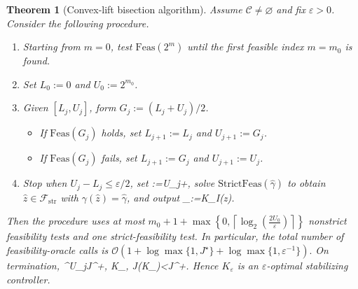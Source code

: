 \documentclass[letterpaper,10pt,conference]{ieeeconf}
\def\[#1\]{\begin{align*}#1\end{align*}}
\providecommand{\cC}{\mathcal{C}}
\providecommand{\cF}{\mathcal{F}}
\renewcommand{\^}[1]{^{(#1)}}
\newtheorem{theorem}{Theorem}
\begin{document}
\begin{theorem}[Convex-lift bisection algorithm]\label{thm:bisection}
Assume $\cC\neq\varnothing$ and fix $\varepsilon>0$. Consider the following procedure.
\begin{enumerate}
    \item Starting from $m=0$, test $\mathrm{Feas}(2^m)$ until the first feasible index $m=m_0$ is found.
    \item Set $L_0:=0$ and $U_0:=2^{m_0}$.
    \item Given $[L_j,U_j]$, form $G_j:=(L_j+U_j)/2$.
    \begin{itemize}[leftmargin=1em]
        \item If $\mathrm{Feas}(G_j)$ holds, set $L_{j+1}:=L_j$ and $U_{j+1}:=G_j$.
        \item If $\mathrm{Feas}(G_j)$ fails, set $L_{j+1}:=G_j$ and $U_{j+1}:=U_j$.
    \end{itemize}
    \item Stop when $U_j-L_j\le\varepsilon/2$, set
    \[
    \widehat\gamma:=U_j+,
    \]
    solve $\mathrm{StrictFeas}(\widehat\gamma)$ to obtain $\widehat z\in\cF_{\mathrm{str}}$ with $\gamma(\widehat z)=\widehat\gamma$, and output
    \[
    K_\varepsilon:=K_I(\widehat z).
    \]
\end{enumerate}
Then the procedure uses at most
$
m_0+1+
\max\left\{
0,
\left\lceil
\log_2\!\left(\frac{2U_0}{\varepsilon}\right)
\right\rceil
\right\}
$
nonstrict feasibility tests and one strict-feasibility test. In
particular, the total number of feasibility-oracle calls is
$
\mathcal{O}\!\left(
1+\log\max\{1,J^\star\}
+\log\max\{1,\varepsilon^{-1}\}
\right).
$
On termination,
\[
J^\star\le U_j\le J^\star+,
\qquad
K_\varepsilon\in\cC,
\qquad
J(K_\varepsilon)<\widehat\gamma\le J^\star+\varepsilon.
\]
Hence $K_\varepsilon$ is an $\varepsilon$-optimal stabilizing controller.
\end{theorem}
\end{document}
